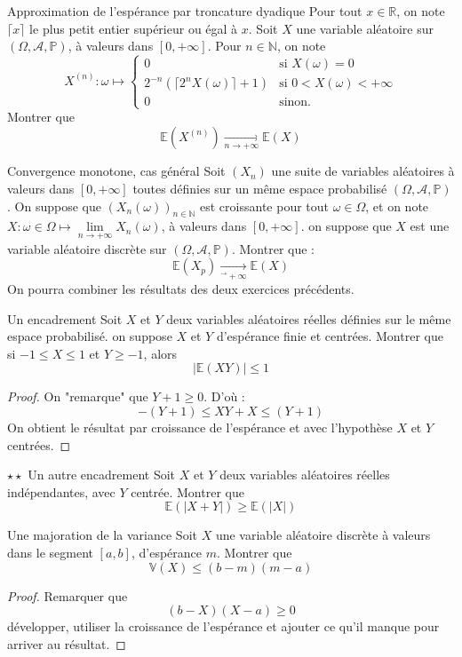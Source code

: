 \documentclass[french,a4paper]{article}
\renewcommand{\P}{\mathbb{P}}
\newcommand{\N}{\mathbb{N}}
\newcommand{\R}{\mathbb{R}}
\newcommand{\E}{\mathbb{E}}
\newcommand{\V}{\mathbb{V}}
\theoremstyle{plain}
\theoremstyle{definition}
\theoremstyle{remark}
\begin{document}
\begin{ex}[Moulin.61]{Approximation de l'espérance par troncature dyadique}
	Pour tout $x\in\R$, on note $\lceil x\rceil$ le plus petit entier supérieur ou égal à $x$. Soit $X$ une variable aléatoire sur $(\Omega,\mathcal{A},\P)$, à valeurs dans $[0,+\infty]$. Pour $n\in\N$, on note $$X^{(n)}:\omega\mapsto\begin{cases}
		0&\text{si }X(\omega)=0\\
		2^{-n}(\lceil 2^nX(\omega)\rceil+1)&\text{si }0<X(\omega)<+\infty \\
		0&\text{sinon.}
	\end{cases}$$ Montrer que $$\E(X^{(n)})\xrightarrow[n\to+\infty]{}\E(X)$$
\end{ex}

\begin{ex}[Moulin.62]{Convergence monotone, cas général}
	Soit $(X_n)$ une suite de variables aléatoires à valeurs dans $[0,+\infty]$ toutes définies sur un même espace probabilisé $(\Omega,\mathcal{A},\P)$. On suppose que $(X_n(\omega))_{n\in\N}$ est croissante pour tout $\omega\in\Omega$, et on note $X:\omega\in\Omega\mapsto\displaystyle\underset{n\to+\infty}{\lim}X_n(\omega)$, à valeurs dans $[0,+\infty]$. on suppose que $X$ est une variable aléatoire discrète sur $(\Omega,\mathcal{A},\P)$. Montrer que : $$\E(X_p)\xrightarrow[^\to+\infty]{}\E(X)$$ On pourra combiner les résultats des deux exercices précédents.
\end{ex}

\begin{ex}[Moulin.63]{Un encadrement}
	Soit $X$ et $Y$ deux variables aléatoires réelles définies sur le même espace probabilisé. on suppose $X$ et $Y$ d'espérance finie et centrées. Montrer que si $-1\leqslant X\leqslant 1$ et $Y\geqslant -1$, alors $$\lvert\E(XY)\rvert\leqslant 1$$
\end{ex}
\begin{proof}
	On "remarque" que $Y+1\geqslant 0$. D'où : $$-(Y+1)\leqslant XY +X\leqslant (Y+1)$$ On obtient le résultat par croissance de l'espérance et avec l'hypothèse $X$ et $Y$ centrées.
\end{proof}

\begin{ex}[Moulin.64]{$\star\star$ Un autre encadrement}
	Soit $X$ et $Y$ deux variables aléatoires réelles indépendantes, avec $Y$ centrée. Montrer que $$\E(\lvert X+Y\rvert)\geqslant\E(\lvert X\rvert)$$
\end{ex}

\begin{ex}[Moulin.65]{Une majoration de la variance}
	Soit $X$ une variable aléatoire discrète à valeurs dans le segment $[a,b]$, d'espérance $m$. Montrer que $$\V(X)\leqslant(b-m)(m-a)$$
\end{ex}
\begin{proof}
	Remarquer que $$(b-X)(X-a)\geqslant0$$ développer, utiliser la croissance de l'espérance et ajouter ce qu'il manque pour arriver au résultat.
\end{proof}
\end{document}
